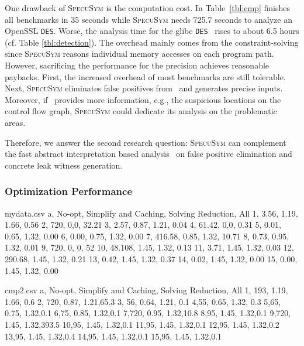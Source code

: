 \documentclass[sigconf, review]{acmart}
\newcommand{\SpecuSym}{\textsc{SpecuSym} }
\begin{document}
One drawback of \SpecuSym is the computation cost. In Table~\ref{tbl:cmp}
\cite{WuW19} finishes all benchmarks in 35 seconds while \SpecuSym needs 
725.7 seconds to analyze an OpenSSL \texttt{DES}. Worse, the analysis time 
for the glibc \texttt{DES}~\cite{glibc} rises to about 6.5 hours (cf. Table
\ref{tbl:detection}). The overhead mainly comes from the constraint-solving 
since \SpecuSym reasons individual memory accesses on each program path. 
However, sacrificing the performance for the precision achieves reasonable 
paybacks. First, the increased overhead of most benchmarks are still tolerable.
Next, \SpecuSym eliminates false positives from~\cite{WuW19} and generates 
precise inputs. Moreover, if~\cite{WuW19} provides more information, e.g., 
the suspicious locations on the control flow graph, \SpecuSym could dedicate 
its analysis on the problematic areas. 


Therefore, we answer the second research question: \SpecuSym can complement 
the fast abstract interpretation based analysis~\cite{WuW19} on false positive 
elimination and concrete leak witness generation.




\subsubsection{Optimization Performance}
\label{sec:opt_perform}


\begin{filecontents*}{mydata.csv}
a, No-opt, Simplify and Caching, Solving Reduction, All
1, 3.56, 1.19, 1.66, 0.56 %
2, 720, 0,0, 32.21 %
3, 2.57, 0.87, 1.21, 0.04  %
4, 61.42, 0,0, 0.31 %
5, 0.01, 0.65, 1.32, 0.00 %
6, 0.00, 0.75, 1.32, 0.00 %
7, 416.58, 0.85, 1.32, 10.71 %
8, 0.73, 0.95, 1.32, 0.01 %
9, 720, 0, 0, 52 %
10, 48.108, 1.45, 1.32, 0.13 %
11, 3.71, 1.45, 1.32, 0.03 %
12, 290.68, 1.45, 1.32, 0.21 %
13, 0.42, 1.45, 1.32, 0.37 %
14, 0.02, 1.45, 1.32, 0.00 %
15, 0.00, 1.45, 1.32, 0.00 %
\end{filecontents*}

\begin{filecontents*}{cmp2.csv}
a, No-opt, Simplify and Caching, Solving Reduction, All
1, 193, 1.19, 1.66, 0.6 
2, 720, 0.87, 1.21,65.3 
3, 56, 0.64, 1.21, 0.1 
4,55, 0.65, 1.32, 0.3 
5,65, 0.75, 1.32,0.1 
6,75, 0.85, 1.32,0.1 
7,720, 0.95, 1.32,10.8 
8,95, 1.45, 1.32,0.1 
9,720, 1.45, 1.32,393.5 
10,95, 1.45, 1.32,0.1 
11,95, 1.45, 1.32,0.1 
12,95, 1.45, 1.32,0.2 
13,95, 1.45, 1.32,0.4 
14,95, 1.45, 1.32,0.1 
15,95, 1.45, 1.32,0.1 
\end{filecontents*}
\end{document}
